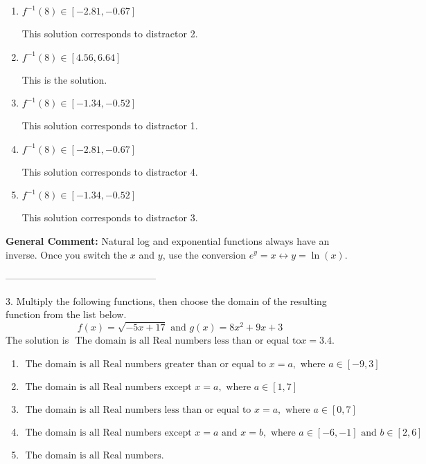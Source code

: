 \documentclass{extbook}[14pt]
\begin{document}
\begin{enumerate}[label=\Alph*.] 
\item $ f^{-1}(8) \in [-2.81, -0.67] $ 

  This solution corresponds to distractor 2. 
\item $ f^{-1}(8) \in [4.56, 6.64] $ 

  This is the solution. 
\item $ f^{-1}(8) \in [-1.34, -0.52] $ 

  This solution corresponds to distractor 1. 
\item $ f^{-1}(8) \in [-2.81, -0.67] $ 

  This solution corresponds to distractor 4. 
\item $ f^{-1}(8) \in [-1.34, -0.52] $ 

  This solution corresponds to distractor 3. 
\end{enumerate} 
 
\textbf{General Comment:} Natural log and exponential functions always have an inverse. Once you switch the $x$ and $y$, use the conversion $ e^y = x \leftrightarrow y=\ln(x)$. 

-----------------------------------------------

3. Multiply the following functions, then choose the domain of the resulting function from the list below.
\[ f(x) = \sqrt{-5x+17}  \text{ and } g(x) = 8x^{2} +9 x + 3 \] 
The solution is $ \text{ The domain is all Real numbers less than or equal to} x = 3.4. $ 

\begin{enumerate}[label=\Alph*.] 
\item $ \text{ The domain is all Real numbers greater than or equal to } x = a, \text{ where } a \in [-9, 3] $ 

  
\item $ \text{ The domain is all Real numbers except } x = a, \text{ where } a \in [1, 7] $ 

  
\item $ \text{ The domain is all Real numbers less than or equal to } x = a, \text{ where } a \in [0, 7] $ 

  
\item $ \text{ The domain is all Real numbers except } x = a \text{ and } x = b, \text{ where } a \in [-6, -1] \text{ and } b \in [2, 6] $ 

  
\item $ \text{ The domain is all Real numbers. } $ 

  
\end{enumerate} 
 
\end{document}
